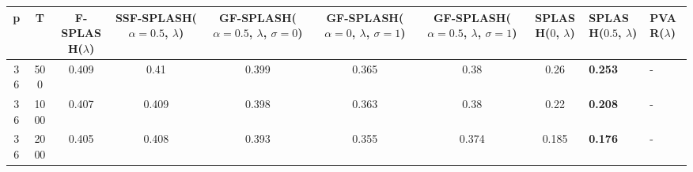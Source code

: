 \begin{tabular}{ccccccccll}
\hline
  p  &  T   &  F-SPLASH($\lambda$)  &  SSF-SPLASH($\alpha=0.5$, $\lambda$)  &  GF-SPLASH($\alpha=0.5$, $\lambda$, $\sigma=0$)  &  GF-SPLASH($\alpha=0$, $\lambda$, $\sigma=1$)  &  GF-SPLASH($\alpha=0.5$, $\lambda$, $\sigma=1$)  &  SPLASH($0$, $\lambda$)  & SPLASH($0.5$, $\lambda$)   & PVAR($\lambda$)   \\
\hline
 36  & 500  &         0.409         &                 0.41                  &                      0.399                       &                     0.365                      &                       0.38                       &           0.26           & \textbf{0.253}             & -                 \\
 36  & 1000 &         0.407         &                 0.409                 &                      0.398                       &                     0.363                      &                       0.38                       &           0.22           & \textbf{0.208}             & -                 \\
 36  & 2000 &         0.405         &                 0.408                 &                      0.393                       &                     0.355                      &                      0.374                       &          0.185           & \textbf{0.176}             & -                 \\
\hline
\end{tabular}